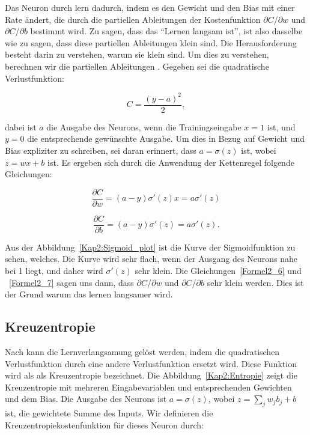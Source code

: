         Das Neuron durch lern dadurch, indem es den Gewicht und den Bias mit einer Rate ändert, die durch die partiellen Ableitungen der Kostenfunktion $\partial$$C$/$\partial$$w$ und $\partial$$C$/$\partial$$b$ bestimmt wird. Zu sagen, dass  das \enquote{Lernen langsam ist}, ist also dasselbe wie zu sagen, dass diese partiellen Ableitungen klein sind. Die Herausforderung besteht darin zu verstehen, warum sie klein sind. Um dies zu verstehen, berechnen wir die partiellen Ableitungen \cite*[61]{Nielsen2015}. Gegeben sei die quadratische Verlustfunktion:

        \begin{equation} \label{Formel2_5}
            C=\frac{( y-a)^{2}}{2},
        \end{equation}

        dabei ist $a$ die Ausgabe des Neurons, wenn die Trainingseingabe $x = 1$ ist, und $y = 0$ die entsprechende gewünschte Ausgabe. Um dies in Bezug auf Gewicht und Bias expliziter zu schreiben, sei daran erinnert, dass $a = \sigma(z)$ ist, wobei $z = wx + b$ ist. Es ergeben sich durch die Anwendung der Kettenregel folgende Gleichungen:

        \begin{equation} \label{Formel2_6}
            \frac{\partial C}{\partial w} =( a-y) \sigma '( z) x=a\sigma '( z)
        \end{equation}

        \begin{equation} \label{Formel2_7}
            \frac{\partial C}{\partial b} =( a-y) \sigma '( z) =a\sigma '( z).
        \end{equation}

        Aus der Abbildung~\ref{Kap2:Sigmoid_plot} ist die Kurve der Sigmoidfunktion zu sehen, welches. Die Kurve wird sehr flach, wenn der Ausgang des Neurons nahe bei 1 liegt, und daher wird $\sigma'(z)$ sehr klein. Die Gleichungen~\ref{Formel2_6} und ~\ref{Formel2_7} sagen uns dann, dass $\partial$$C$/$\partial$$w$  und  $\partial$$C$/$\partial$$b$ sehr klein werden. Dies ist der Grund warum das lernen langsamer wird.

    \subsection{Kreuzentropie}
    Nach \cite*[62]{Nielsen2015} kann die Lernverlangsamung gelöst werden, indem die quadratischen Verlustfunktion durch eine andere Verlustfunktion ersetzt wird. Diese Funktion wird als als Kreuzentropie bezeichnet. Die Abbildung~\ref{Kap2:Entropie} zeigt die Kreuzentropie mit mehreren Eingabevariablen und entsprechenden Gewichten und dem Bias. Die Ausgabe des Neurons ist $a = \sigma(z)$, wobei $z =  \sum _{j} w_{j} b_{j} + b$ ist, die gewichtete Summe des Inputs. Wir definieren die Kreuzentropiekostenfunktion für dieses Neuron durch:

